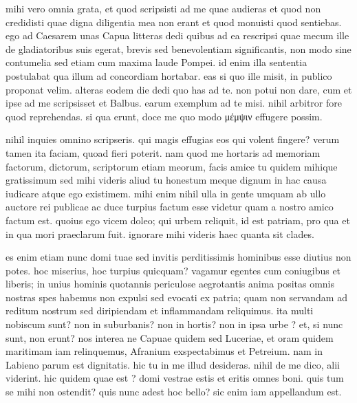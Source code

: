 


 mihi vero omnia grata, et quod scripsisti ad me quae audieras et quod non credidisti quae digna diligentia mea non erant et quod monuisti quod sentiebas. ego ad Caesarem unas Capua litteras dedi quibus ad ea rescripsi quae mecum ille de gladiatoribus suis egerat, brevis sed benevolentiam significantis, non modo sine contumelia sed etiam cum maxima laude Pompei. id enim illa sententia postulabat qua illum ad concordiam hortabar. eas si quo ille misit, in publico proponat velim. alteras eodem die dedi quo has ad te. non potui non dare, cum et ipse ad me scripsisset et Balbus. earum exemplum ad te misi. nihil arbitror fore quod reprehendas. si qua erunt, doce me quo modo μέμψιν effugere possim.

 nihil inquies omnino scripseris. qui magis effugias eos qui volent fingere? verum tamen ita faciam, quoad fieri poterit. nam quod me hortaris ad memoriam factorum, dictorum, scriptorum etiam meorum, facis amice tu quidem mihique gratissimum sed mihi videris aliud tu honestum meque dignum in hac causa iudicare atque ego existimem. mihi enim nihil ulla in gente umquam ab ullo auctore rei publicae ac duce turpius factum esse videtur quam a nostro amico factum est. quoius ego vicem doleo; qui urbem reliquit, id est patriam, pro qua et in qua mori praeclarum fuit. ignorare mihi videris haec quanta sit clades.

 es enim etiam nunc domi tuae sed invitis perditissimis hominibus esse diutius non potes. hoc miserius, hoc turpius quicquam? vagamur egentes cum coniugibus et liberis; in unius hominis quotannis periculose aegrotantis anima positas omnis nostras spes habemus non expulsi sed evocati ex patria; quam non servandam ad reditum nostrum sed diripiendam et inflammandam reliquimus. ita multi nobiscum sunt? non in suburbanis? non in hortis? non in ipsa urbe ? et, si nunc sunt, non erunt? nos interea ne Capuae quidem sed Luceriae, et oram quidem maritimam iam relinquemus, Afranium exspectabimus et Petreium. nam in Labieno parum est dignitatis. hic tu in me illud desideras. nihil de me dico, alii viderint. hic quidem quae est ? domi vestrae estis et eritis omnes boni. quis tum se mihi non ostendit? quis nunc adest hoc bello? sic enim iam appellandum est.

